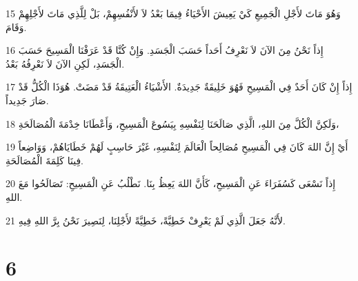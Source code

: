 \par 15 وَهُوَ مَاتَ لأَجْلِ الْجَمِيعِ كَيْ يَعِيشَ الأَحْيَاءُ فِيمَا بَعْدُ لاَ لأَنْفُسِهِمْ، بَلْ لِلَّذِي مَاتَ لأَجْلِهِمْ وَقَامَ.
\par 16 إِذاً نَحْنُ مِنَ الآنَ لاَ نَعْرِفُ أَحَداً حَسَبَ الْجَسَدِ. وَإِنْ كُنَّا قَدْ عَرَفْنَا الْمَسِيحَ حَسَبَ الْجَسَدِ، لَكِنِ الآنَ لاَ نَعْرِفُهُ بَعْدُ.
\par 17 إِذاً إِنْ كَانَ أَحَدٌ فِي الْمَسِيحِ فَهُوَ خَلِيقَةٌ جَدِيدَةٌ. الأَشْيَاءُ الْعَتِيقَةُ قَدْ مَضَتْ. هُوَذَا الْكُلُّ قَدْ صَارَ جَدِيداً.
\par 18 وَلَكِنَّ الْكُلَّ مِنَ اللهِ، الَّذِي صَالَحَنَا لِنَفْسِهِ بِيَسُوعَ الْمَسِيحِ، وَأَعْطَانَا خِدْمَةَ الْمُصَالَحَةِ،
\par 19 أَيْ إِنَّ اللهَ كَانَ فِي الْمَسِيحِ مُصَالِحاً الْعَالَمَ لِنَفْسِهِ، غَيْرَ حَاسِبٍ لَهُمْ خَطَايَاهُمْ، وَوَاضِعاً فِينَا كَلِمَةَ الْمُصَالَحَةِ.
\par 20 إِذاً نَسْعَى كَسُفَرَاءَ عَنِ الْمَسِيحِ، كَأَنَّ اللهَ يَعِظُ بِنَا. نَطْلُبُ عَنِ الْمَسِيحِ: تَصَالَحُوا مَعَ اللهِ.
\par 21 لأَنَّهُ جَعَلَ الَّذِي لَمْ يَعْرِفْ خَطِيَّةً، خَطِيَّةً لأَجْلِنَا، لِنَصِيرَ نَحْنُ بِرَّ اللهِ فِيهِ.

\chapter{6}

